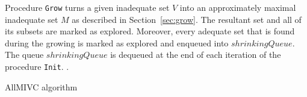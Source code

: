 Procedure \texttt{Grow} turns a given inadequate set $V$ into an approximately maximal inadequate set $M$ as described in Section~\ref{sec:grow}. The resultant set and all of its subsets are marked as explored. Moreover, every adequate set that is found during the growing is marked as explored and enqueued into $\mathit{shrinkingQueue}$. 
The queue $\mathit{shrinkingQueue}$ is dequeued at the end of each iteration of the procedure \texttt{Init}.  .




\begin{algorithm}[!t]

\caption{AllMIVC algorithm}
\label{alg:allmivc}
\end{algorithm}




